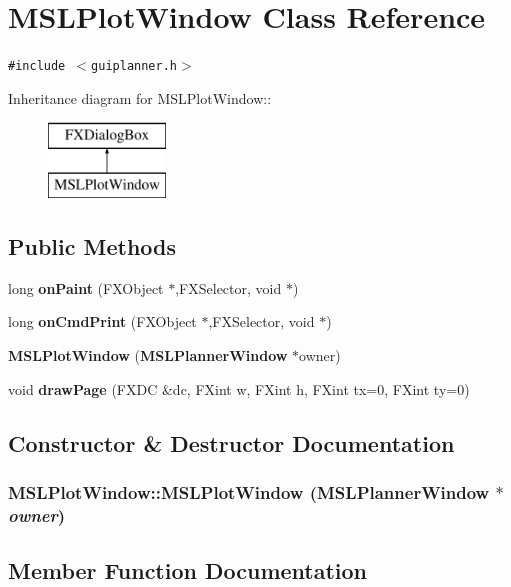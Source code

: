 \section{MSLPlot\-Window  Class Reference}
\label{class_MSLPlotWindow}
{\tt \#include $<$guiplanner.h$>$}

Inheritance diagram for MSLPlot\-Window::\begin{figure}[H]
\begin{center}
\leavevmode
\includegraphics[height=2cm]{class_MSLPlotWindow}
\end{center}
\end{figure}
\subsection*{Public Methods}
\begin{CompactItemize}
\item 
long {\bf on\-Paint} (FXObject $\ast$,FXSelector, void $\ast$)
\item 
long {\bf on\-Cmd\-Print} (FXObject $\ast$,FXSelector, void $\ast$)
\item 
{\bf MSLPlot\-Window} ({\bf MSLPlanner\-Window} $\ast$owner)
\item 
void {\bf draw\-Page} (FXDC \&dc, FXint w, FXint h, FXint tx=0, FXint ty=0)
\end{CompactItemize}


\subsection{Constructor \& Destructor Documentation}
\subsubsection{\setlength{\rightskip}{0pt plus 5cm}MSLPlot\-Window::MSLPlot\-Window ({\bf MSLPlanner\-Window} $\ast$ {\em owner})}\label{class_MSLPlotWindow_a2}




\subsection{Member Function Documentation}
